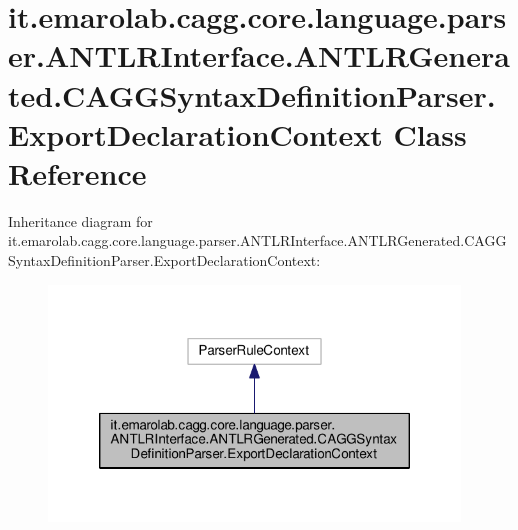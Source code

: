 \hypertarget{classit_1_1emarolab_1_1cagg_1_1core_1_1language_1_1parser_1_1ANTLRInterface_1_1ANTLRGenerated_1_f2ce61382cbd60c083a2c9ee089270d2}{\section{it.\-emarolab.\-cagg.\-core.\-language.\-parser.\-A\-N\-T\-L\-R\-Interface.\-A\-N\-T\-L\-R\-Generated.\-C\-A\-G\-G\-Syntax\-Definition\-Parser.\-Export\-Declaration\-Context Class Reference}
\label{classit_1_1emarolab_1_1cagg_1_1core_1_1language_1_1parser_1_1ANTLRInterface_1_1ANTLRGenerated_1_f2ce61382cbd60c083a2c9ee089270d2}
}


Inheritance diagram for it.\-emarolab.\-cagg.\-core.\-language.\-parser.\-A\-N\-T\-L\-R\-Interface.\-A\-N\-T\-L\-R\-Generated.\-C\-A\-G\-G\-Syntax\-Definition\-Parser.\-Export\-Declaration\-Context\-:
\nopagebreak
\begin{figure}[H]
\begin{center}
\leavevmode
\includegraphics[width=310pt]{classit_1_1emarolab_1_1cagg_1_1core_1_1language_1_1parser_1_1ANTLRInterface_1_1ANTLRGenerated_1_d84bc0de6eca5a9f7a0ce58ee9cc3daa}
\end{center}
\end{figure}


